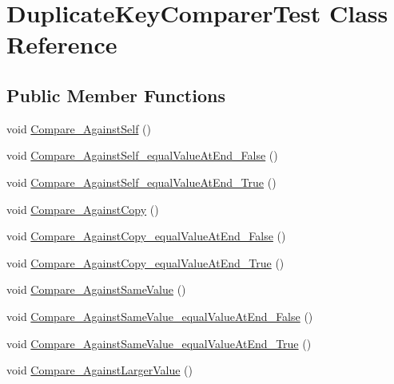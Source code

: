 \hypertarget{class_duplicate_key_comparer_test}{}\section{Duplicate\+Key\+Comparer\+Test Class Reference}
\label{class_duplicate_key_comparer_test}
\subsection*{Public Member Functions}
\begin{DoxyCompactItemize}
\item 
void \hyperlink{class_duplicate_key_comparer_test_a72992fdc6ec93137493e4fd5e7c13e3a}{Compare\+\_\+\+Against\+Self} ()
\item 
void \hyperlink{class_duplicate_key_comparer_test_a24915ec83470f413545a99eebad688c9}{Compare\+\_\+\+Against\+Self\+\_\+equal\+Value\+At\+End\+\_\+\+False} ()
\item 
void \hyperlink{class_duplicate_key_comparer_test_aa94101e4b66e2d8dc65a7c51e5a23bc0}{Compare\+\_\+\+Against\+Self\+\_\+equal\+Value\+At\+End\+\_\+\+True} ()
\item 
void \hyperlink{class_duplicate_key_comparer_test_a68bf257cd3c36fa966e10f480dd05cc4}{Compare\+\_\+\+Against\+Copy} ()
\item 
void \hyperlink{class_duplicate_key_comparer_test_a65c71124110b69b3614b90b0f792585b}{Compare\+\_\+\+Against\+Copy\+\_\+equal\+Value\+At\+End\+\_\+\+False} ()
\item 
void \hyperlink{class_duplicate_key_comparer_test_aab6357b20eef132289cbb223af3d1ffe}{Compare\+\_\+\+Against\+Copy\+\_\+equal\+Value\+At\+End\+\_\+\+True} ()
\item 
void \hyperlink{class_duplicate_key_comparer_test_ac9539cb6f901ee75dcc88ee96468f1f7}{Compare\+\_\+\+Against\+Same\+Value} ()
\item 
void \hyperlink{class_duplicate_key_comparer_test_ace2a984b6d40d213fdb73ddc37a7667e}{Compare\+\_\+\+Against\+Same\+Value\+\_\+equal\+Value\+At\+End\+\_\+\+False} ()
\item 
void \hyperlink{class_duplicate_key_comparer_test_ae9c0b8b38a72ba7cf2be69b8cc7ed5e1}{Compare\+\_\+\+Against\+Same\+Value\+\_\+equal\+Value\+At\+End\+\_\+\+True} ()
\item 
void \hyperlink{class_duplicate_key_comparer_test_aa0f004cab51c0b938a6f2f0df46bf4b2}{Compare\+\_\+\+Against\+Larger\+Value} ()
\item 

\end{DoxyCompactItemize}

